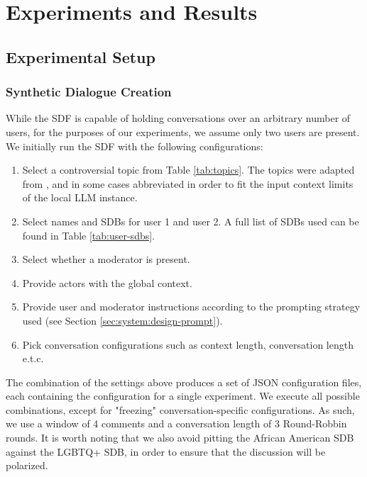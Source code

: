 %
\chapter{Experiments and Results}
\label{sec:evaluation}


\section{Experimental Setup}
\label{sec:evaluation:experimental}

\subsection{Synthetic Dialogue Creation}
\label{ssec:evaluation:experimental-dialogue}

While the \ac{SDF} is capable of holding conversations over an arbitrary number of users, for the purposes of our experiments, we assume only two users are present. We initially run the \ac{SDF} with the following configurations:

\begin{enumerate}
	\item Select a controversial topic from Table \ref{tab:topics}. The topics were adapted from \citet{pavlopoulos-likas-2024-polarized}, and in some cases abbreviated in order to fit the input context limits of the local LLM instance. 
	
	\item Select names and \acp{SDB} for user 1 and user 2. A full list of \acp{SDB} used can be found in Table \ref{tab:user-sdbs}.
	
	\item Select whether a moderator is present.
	
	\item Provide actors with the global context.
	
	\item Provide user and moderator instructions according to the prompting strategy used (see Section \ref{sec:system:design-prompt}).
	
	\item Pick conversation configurations such as context length, conversation length e.t.c.
\end{enumerate}

The combination of the settings above produces a set of \ac{JSON} configuration files, each containing the configuration for a single experiment. We execute all possible combinations, except for "freezing" conversation-specific configurations. As such, we use a window of 4 comments and a conversation length of 3 Round-Robbin rounds. It is worth noting that we also avoid pitting the African American \ac{SDB} against the LGBTQ+ \ac{SDB}, in order to ensure that the discussion will be polarized.

